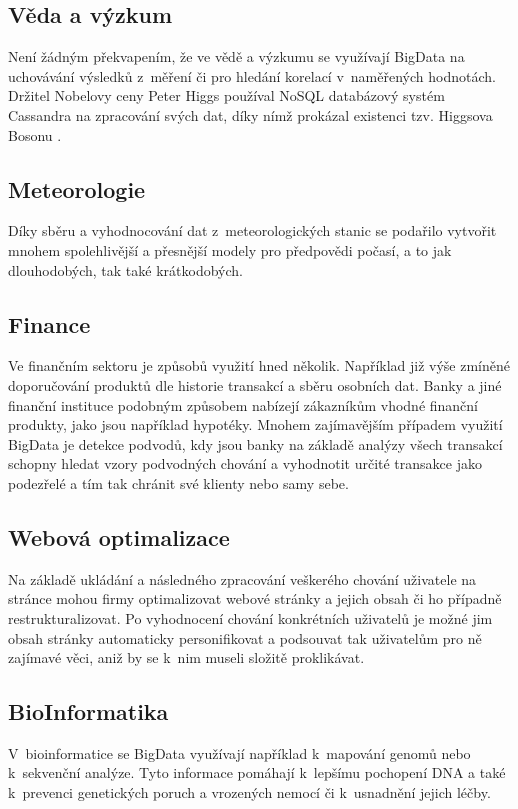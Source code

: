 \subsection{Věda a výzkum}

Není žádným překvapením, že ve vědě a výzkumu se využívají BigData na uchovávání výsledků z~měření či pro hledání korelací v~naměřených hodnotách. Držitel Nobelovy ceny Peter Higgs používal NoSQL databázový systém Cassandra na zpracování svých dat, díky nímž prokázal existenci tzv. Higgsova Bosonu \cite{higgs}.

\subsection{Meteorologie}
Díky sběru a vyhodnocování dat z~meteorologických stanic se podařilo vytvořit mnohem spolehlivější a přesnější modely pro předpovědi počasí, a to jak dlouhodobých, tak také krátkodobých. 

\subsection{Finance}
Ve finančním sektoru je způsobů využití hned několik. Například již výše zmíněné doporučování produktů dle historie transakcí a sběru  osobních dat. Banky a jiné finanční instituce podobným způsobem nabízejí zákazníkům vhodné finanční produkty, jako jsou například hypotéky. Mnohem zajímavějším případem využití BigData je detekce podvodů, kdy jsou banky na základě analýzy všech transakcí schopny hledat vzory podvodných chování a vyhodnotit určité transakce jako podezřelé a tím tak chránit své klienty nebo samy sebe.

\subsection{Webová optimalizace}
Na základě ukládání a následného zpracování veškerého chování uživatele na stránce mohou firmy optimalizovat webové stránky a jejich obsah či ho případně restrukturalizovat. Po vyhodnocení chování konkrétních uživatelů je možné jim obsah stránky automaticky personifikovat a podsouvat tak uživatelům pro ně zajímavé věci, aniž by se k~nim museli složitě proklikávat.

\subsection{BioInformatika}
V~bioinformatice se BigData využívají například k~mapování genomů nebo k~sekvenční analýze. Tyto informace pomáhají k~lepšímu pochopení DNA a také k~prevenci genetických poruch a vrozených nemocí či k~usnadnění jejich léčby. \cite{industries} 

